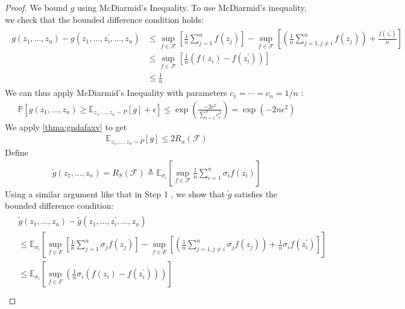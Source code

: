 \documentclass{article}
\begin{document}
\begin{proof}
 We bound $g$ using McDiarmid's Inequality. To use McDiarmid's inequality, we check that the bounded difference condition holds:
\begin{align*}
\begin{aligned}
g\left(z_{1}, \ldots, z_{n}\right)-g\left(z_{1}, \ldots, z_{i}^{\prime}, \ldots, z_{n}\right) & \leq \sup _{f \in \mathcal{F}}\left[\frac{1}{n} \sum_{j=1}^{n} f\left(z_{j}\right)\right]-\sup _{f \in \mathcal{F}}\left[\left(\frac{1}{n} \sum_{j=1, j \neq i}^{n} f\left(z_{j}\right)\right)+\frac{f\left(z_{i}^{\prime}\right)}{n}\right] \\
& \leq \sup _{f \in \mathcal{F}}\left[\frac{1}{n}\left(f\left(z_{i}\right)-f\left(z_{i}^{\prime}\right)\right)\right] \\
& \leq \frac{1}{n}
\end{aligned}
\end{align*}
 We can thus apply McDiarmid's Inequality with parameters $c_{1}=\cdots=c_{n}=1 / n$ :
\begin{align*}
\mathbb{P}\left[g\left(z_{1}, \ldots, z_{n}\right) \geq \mathbb{E}_{z_{1}, \ldots, z_{n} \sim P}[g]+\epsilon\right] \leq \exp \left(\frac{-2 \epsilon^{2}}{\sum_{i=1}^{n} c_{i}^{2}}\right)=\exp \left(-2 n \epsilon^{2}\right)
\end{align*}
 We apply \cref{thma:gndafaxv} to get
\begin{align*}
\mathbb{E}_{z_{1}, \ldots, z_{n} \sim P}[g] \leq 2 R_{n}(\mathcal{F})
\end{align*}
 Define
\begin{align*}
\tilde{g}\left(z_{1}, \ldots, z_{n}\right)=R_{S}(\mathcal{F}) \triangleq \mathbb{E}_{\sigma_{i}}\left[\sup _{f \in \mathcal{F}} \frac{1}{n} \sum_{i=1}^{n} \sigma_{i} f\left(z_{i}\right)\right]
\end{align*}
Using a similar argument like that in Step 1 , we show that $\tilde{g}$ satisfies the bounded difference condition:
\begin{align*}
\begin{aligned}
&\tilde{g}\left(z_{1}, \ldots, z_{n}\right)-\tilde{g}\left(z_{1}, \ldots, z_{i}^{\prime}, \ldots, z_{n}\right) \\
&\leq \mathbb{E}_{\sigma_{i}}\left[\sup _{f \in F}\left[\frac{1}{n} \sum_{j=1}^{n} \sigma_{j} f\left(z_{j}\right)\right]-\sup _{f \in F}\left[\left(\frac{1}{n} \sum_{j=1, j \neq i}^{n} \sigma_{j} f\left(z_{j}\right)\right)+\frac{1}{n} \sigma_{i} f\left(z_{i}^{\prime}\right)\right]\right] \\
&\leq \mathbb{E}_{\sigma_{i}}\left[\sup _{f \in F}\left(\frac{1}{n} \sigma_{i}\left(f\left(z_{i}\right)-f\left(z_{i}^{\prime}\right)\right)\right)\right] \\

\end{aligned}
\end{align*}
\end{proof}
\end{document}
